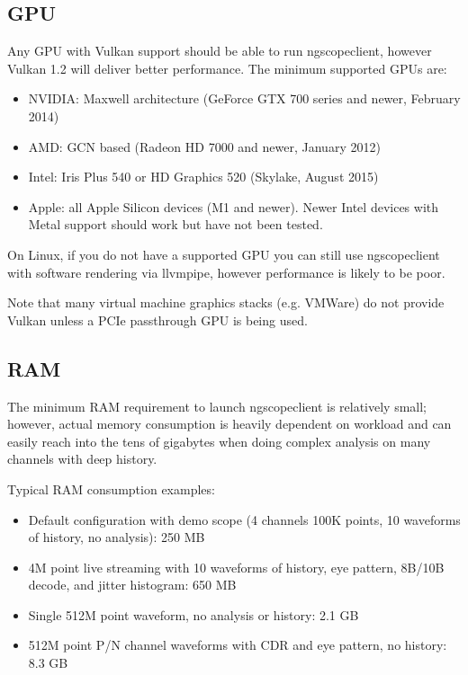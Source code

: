 \subsection{GPU}

Any GPU with Vulkan support should be able to run ngscopeclient, however Vulkan 1.2 will deliver better performance.
The minimum supported GPUs are:
\begin{itemize}
\item NVIDIA: Maxwell architecture (GeForce GTX 700 series and newer, February 2014)
\item AMD: GCN based (Radeon HD 7000 and newer, January 2012)
\item Intel: Iris Plus 540 or HD Graphics 520 (Skylake, August 2015)
\item Apple: all Apple Silicon devices (M1 and newer). Newer Intel devices with Metal support should work but have not
been tested.
\end{itemize}

On Linux, if you do not have a supported GPU you can still use ngscopeclient with software rendering via llvmpipe, however performance is likely to be poor.

Note that many virtual machine graphics stacks (e.g. VMWare) do not provide Vulkan unless a PCIe passthrough GPU is
being used.

\subsection{RAM}

The minimum RAM requirement to launch ngscopeclient is relatively small; however, actual memory consumption is
heavily dependent on workload and can easily reach into the tens of gigabytes when doing complex analysis on many
channels with deep history.

Typical RAM consumption examples:
\begin{itemize}
\item Default configuration with demo scope (4 channels 100K points, 10 waveforms of history, no analysis): 250 MB
\item 4M point live streaming with 10 waveforms of history, eye pattern, 8B/10B decode, and jitter histogram: 650 MB
\item Single 512M point waveform, no analysis or history: 2.1 GB
\item 512M point P/N channel waveforms with CDR and eye pattern, no history: 8.3 GB
\end{itemize}

